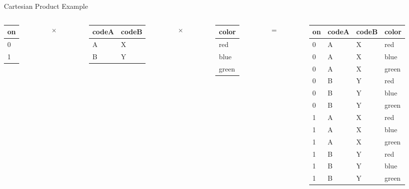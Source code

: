\documentclass[aspectratio=169]{beamer}
\begin{document}

\begin{frame}{Cartesian Product Example}
\scriptsize{
\begin{columns}
\begin{column}{0.05\textwidth}
\begin{tabular}{|l|}  \hline
\textbf{on} \\ \hline
0 \\ \hline
1 \\ \hline
\end{tabular}
\end{column}
\begin{column}{0.005\textwidth}
${\times}$
\end{column}
\begin{column}{0.25\textwidth}
\begin{tabular}{|l|l|}  \hline
\textbf{codeA} & \textbf{codeB} \\ \hline
A & X \\ \hline
B & Y \\ \hline
\end{tabular}
\end{column}
\begin{column}{0.005\textwidth}
$\times$
\end{column}
\begin{column}{0.15\textwidth}
\begin{tabular}{|l|}  \hline
\textbf{color} \\ \hline
red \\ \hline
blue \\ \hline
green \\ \hline
\end{tabular}
\end{column}
\begin{column}{0.005\textwidth}
$\textbf{=}$
\end{column}
\begin{column}{0.4\textwidth}
\begin{tabular}{|l|l|l|l|}  \hline
\textbf{on} & \textbf{codeA} & \textbf{codeB}& \textbf{color} \\ \hline
0 & A & X & red \\ \hline
0 & A & X & blue \\ \hline
0 & A & X & green \\ \hline
0 & B & Y & red \\ \hline
0 & B & Y & blue \\ \hline
0 & B & Y & green \\ \hline
1 & A & X & red \\ \hline
1 & A & X & blue \\ \hline
1 & A & X & green \\ \hline
1 & B & Y & red \\ \hline
1 & B & Y & blue \\ \hline
1 & B & Y & green \\ \hline
\end{tabular}
\end{column}\end{columns}
}
\end{frame}
\end{document}
